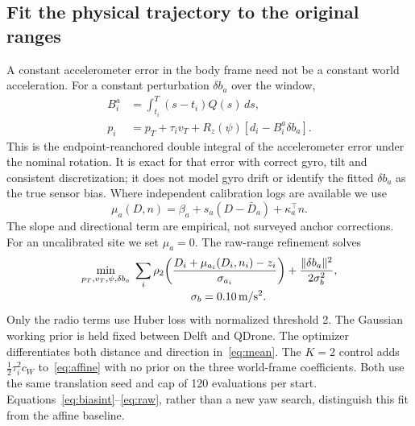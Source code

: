 \documentclass[conference,letterpaper,10pt]{IEEEtran}
\newcommand{\rz}{R_z}
\begin{document}
\subsection{Fit the physical trajectory to the original ranges}
A constant accelerometer error in the body frame need not be a constant world acceleration. For a constant perturbation $\delta b_a$ over the window,
\begin{align}
 B_i^a&=\int_{t_i}^{T}(s-t_i)Q(s)\,ds,\label{eq:biasint}\\
 p_i&=p_T+\tau_i v_T+\rz(\psi)[d_i-B_i^a\delta b_a]. \label{eq:bias}
\end{align}
This is the endpoint-reanchored double integral of the accelerometer error under the nominal rotation. It is exact for that error with correct gyro, tilt and consistent discretization; it does not model gyro drift or identify the fitted $\delta b_a$ as the true sensor bias. Where independent calibration logs are available we use
\begin{equation}
 \mu_a(D,n)=\beta_a+s_a(D-\bar D_a)+\kappa_a^\top n. \label{eq:mean}
\end{equation}
The slope and directional term are empirical, not surveyed anchor corrections. For an uncalibrated site we set $\mu_a=0$. The raw-range refinement solves
\begin{align}
 \min_{p_T,v_T,\psi,\delta b_a}\;&\sum_i\rho_2\!\left(
      \frac{D_i+\mu_{a_i}(D_i,n_i)-z_i}{\sigma_{a_i}}\right)
       +\frac{\|\delta b_a\|^2}{2\sigma_b^2},\nonumber\\[-2pt]
 &\hspace{18mm}\sigma_b=0.10\,\mathrm{m/s^2}.             \label{eq:raw}
\end{align}
Only the radio terms use Huber loss with normalized threshold 2. The Gaussian working prior is held fixed between Delft and QDrone. The optimizer differentiates both distance and direction in~\eqref{eq:mean}. The $K=2$ control adds $\tfrac12\tau_i^2c_W$ to~\eqref{eq:affine} with no prior on the three world-frame coefficients. Both use the same translation seed and cap of 120 evaluations per start. Equations~\eqref{eq:biasint}--\eqref{eq:raw}, rather than a new yaw search, distinguish this fit from the affine baseline.
\end{document}
